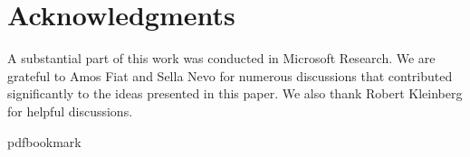 \documentclass[11pt]{article}
\numberwithin{equation}{section}
\theoremstyle{definition}
\theoremstyle{plain}
\theoremstyle{plain}
\begin{document}
\section*{Acknowledgments}

	A substantial part of this work was conducted in Microsoft Research. We are grateful to Amos Fiat and Sella Nevo for numerous discussions that contributed significantly to the ideas presented in this paper. We also thank Robert Kleinberg for helpful discussions.

\nocite{conf-version}

\newcommand{\prelim}{Preliminary version in\ }\newcommand{\prelims}{Preliminary
  versions in\ }
\providecommand{\bibhead}[1]{}
\expandafter\ifx\csname pdfbookmark\endcsname\relax%
  \providecommand{\tocrefpdfbookmark}{}
\else\providecommand{\tocrefpdfbookmark}{%
   \hypertarget{tocreferences}{}%
   \pdfbookmark[1]{References}{tocreferences}}%
\fi
\end{document}
